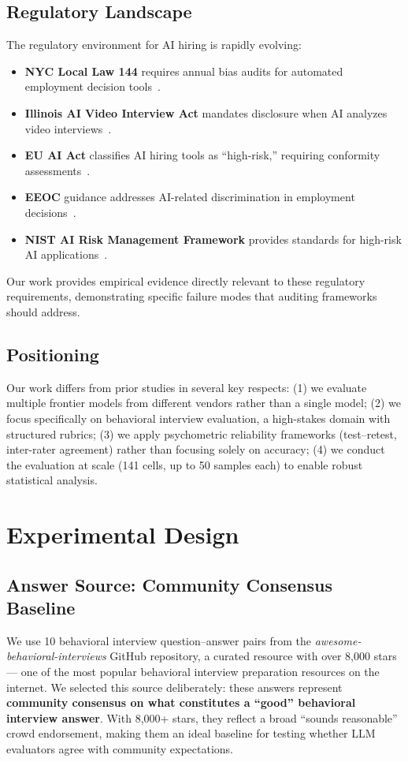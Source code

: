 \documentclass{article}
\begin{document}
\subsection{Regulatory Landscape}
The regulatory environment for AI hiring is rapidly evolving:
\begin{itemize}
  \item \textbf{NYC Local Law 144} requires annual bias audits for automated employment decision tools~\cite{nyc2023}.
  \item \textbf{Illinois AI Video Interview Act} mandates disclosure when AI analyzes video interviews~\cite{illinois2020}.
  \item \textbf{EU AI Act} classifies AI hiring tools as ``high-risk,'' requiring conformity assessments~\cite{euaiact2024}.
  \item \textbf{EEOC} guidance addresses AI-related discrimination in employment decisions~\cite{eeoc2023}.
  \item \textbf{NIST AI Risk Management Framework} provides standards for high-risk AI applications~\cite{nist2023}.
\end{itemize}
Our work provides empirical evidence directly relevant to these regulatory requirements, demonstrating specific failure modes that auditing frameworks should address.

\subsection{Positioning}
Our work differs from prior studies in several key respects: (1) we evaluate multiple frontier models from different vendors rather than a single model; (2) we focus specifically on behavioral interview evaluation, a high-stakes domain with structured rubrics; (3) we apply psychometric reliability frameworks (test--retest, inter-rater agreement) rather than focusing solely on accuracy; (4) we conduct the evaluation at scale (141 cells, up to 50 samples each) to enable robust statistical analysis.

\section{Experimental Design}\label{sec:design}

\subsection{Answer Source: Community Consensus Baseline}
We use 10 behavioral interview question--answer pairs from the \textit{awesome-behavioral-interviews} GitHub repository, a curated resource with over 8{,}000 stars --- one of the most popular behavioral interview preparation resources on the internet. We selected this source deliberately: these answers represent \textbf{community consensus on what constitutes a ``good'' behavioral interview answer}. With 8{,}000+ stars, they reflect a broad ``sounds reasonable'' crowd endorsement, making them an ideal baseline for testing whether LLM evaluators agree with community expectations.
\end{document}
